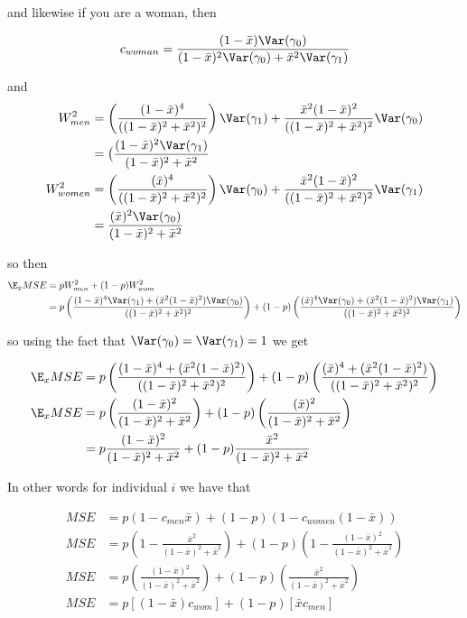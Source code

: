 and likewise if you are a woman, then

\begin{align*}
	c_{woman} = \frac{(1-\bar{x})\Var(\gamma_0)}{(1-\bar{x})^2\Var(\gamma_0) + \bar{x}^2\Var(\gamma_1)}
\end{align*}


and 
\begin{align*}
	W_{men}^2 &= \left(\frac{(1-\bar{x})^4}{((1-\bar{x})^2 + \bar{x}^2)^2}\right) \Var(\gamma_1) +  \frac{\bar{x}^2 (1-\bar{x})^2}{((1-\bar{x})^2 + \bar{x}^2)^2} \Var(\gamma_0) \\
			  &= \big(\frac{(1-\bar{x})^2 \Var(\gamma_1)} {(1-\bar{x})^2 + \bar{x}^2} \\
	W_{women}^2 &= \left(\frac{(\bar{x})^4}{((1-\bar{x})^2 + \bar{x}^2)^2}\right) \Var(\gamma_0) + \frac{\bar{x}^2 (1-\bar{x})^2}{((1-\bar{x})^2 + \bar{x}^2)^2} \Var(\gamma_1) \\
				&= \frac{(\bar{x})^2 \Var(\gamma_0) }{(1-\bar{x})^2 + \bar{x}^2} \\
\end{align*} 


so then
\begin{align*}
	\E_x MSE &= p W_{men}^2 + (1 - p)W_{wom}^2 \\
	&= p \left(\frac{(1-\bar{x})^4\Var(\gamma_1) + ( \bar{x}^2 (1-\bar{x})^2 ) \Var(\gamma_0)}{((1-\bar{x})^2 + \bar{x}^2)^2}\right) + (1-p)\left(\frac{(\bar{x})^4 \Var(\gamma_0) + ( \bar{x}^2 (1-\bar{x})^2 ) \Var(\gamma_1) }{((1-\bar{x})^2 + \bar{x}^2)^2}\right) \\
\end{align*} 

so using the fact that $\Var(\gamma_0) = \Var(\gamma_1) = 1$ we get

\begin{align*}
	\E_x MSE &= p \left(\frac{(1-\bar{x})^4 + ( \bar{x}^2 (1-\bar{x})^2 ) }{((1-\bar{x})^2 + \bar{x}^2)^2}\right) + (1-p)\left(\frac{(\bar{x})^4  + ( \bar{x}^2 (1-\bar{x})^2 ) }{((1-\bar{x})^2 + \bar{x}^2)^2}\right) \\
	\E_x MSE &= p \left(\frac{(1-\bar{x})^2 }{(1-\bar{x})^2 + \bar{x}^2}\right) + (1-p)\left(\frac{(\bar{x})^2 }{(1-\bar{x})^2 + \bar{x}^2}\right) \\
			 &= p \frac{(1-\bar{x})^2}{(1-\bar{x})^2 + \bar{x}^2} + (1-p) \frac{\bar{x}^2}{(1-\bar{x})^2 + \bar{x}^2}
\end{align*} 

In other words for individual $i$ we have that

\begin{align*}
	 MSE &= p (1 - c_{men} \bar{x}) + (1-p) (1 - c_{women} (1 - \bar{x})) \\
	 MSE &= p \left(1 - \frac{\bar{x}^2}{(1-\bar{x})^2 + \bar{x}^2}\right) + (1-p) \left(1 - \frac{(1-\bar{x})^2}{(1-\bar{x})^2 + \bar{x}^2} \right) \\
	 MSE &= p \left(\frac{(1 - \bar{x})^2}{(1-\bar{x})^2 + \bar{x}^2}\right) + (1-p) \left(\frac{\bar{x}^2}{(1-\bar{x})^2 + \bar{x}^2} \right) \\
	 MSE &= p \left[ (1 - \bar{x})c_{wom} \right] + (1-p) \left[ \bar{x}c_{men} \right] \\
\end{align*} 

